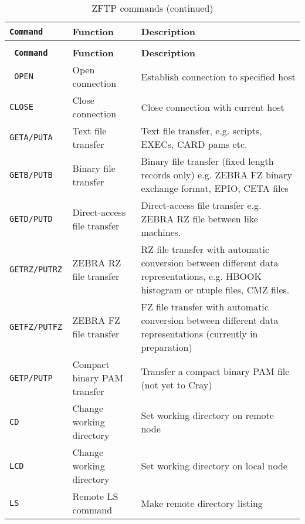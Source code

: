 \begin{longtable}{|>{\tt}p{}|p{}|p{}|}
\caption[ZFTP commands]{ZFTP commands\label{tab:ZFTPCOM}}\\
\hline
\rm\bf Command     & \rm\bf Function             &\rm\bf Description          \\
\hline
\endfirsthead
\caption[]{ZFTP commands (continued)}\\
\hline
\rm\bf Command     & \rm\bf Function             &\rm\bf Description          \\
\hline
\endhead
\hline
\endfoot
\tt OPEN         & Open connection             &
   Establish connection to specified host                                     \\
\tt CLOSE        & Close connection            &
   Close connection with current host                                         \\
\tt GETA/PUTA    & Text file transfer          &
   Text file transfer, e.g. scripts, EXECs, CARD pams etc.                    \\
\tt GETB/PUTB    & Binary file transfer        &
   Binary file transfer (fixed length records only)
   e.g. ZEBRA FZ binary exchange format, EPIO, CETA files                     \\
\tt GETD/PUTD    & Direct-access file transfer &
   Direct-access file transfer
   e.g. ZEBRA RZ file between like machines.                                  \\
\tt GETRZ/PUTRZ  & ZEBRA RZ file transfer      &
   RZ file transfer with automatic conversion between different
   data representations,
   e.g. HBOOK histogram or ntuple files, CMZ files.                           \\
\tt GETFZ/PUTFZ  & ZEBRA FZ file transfer      &
   FZ file transfer with automatic conversion between different
   data representations (currently in preparation)                            \\
\tt GETP/PUTP    & Compact binary PAM transfer &
   Transfer a compact binary PAM file (not yet to Cray)                       \\
\tt CD           & Change working directory    &
   Set working directory on remote node                                       \\
\tt LCD          & Change working directory    &
   Set working directory on local  node                                       \\
\tt LS           & Remote LS command           &
   Make remote directory listing                                              \\

\end{longtable}

